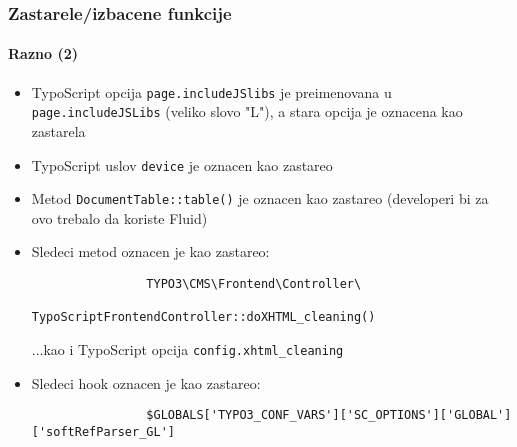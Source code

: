 \begin{frame}[fragile]
	\frametitle{Zastarele/izbacene funkcije}
	\framesubtitle{Razno (2)}

	\begin{itemize}
		\item TypoScript opcija \texttt{page.includeJSlibs} je preimenovana u\newline
			\texttt{page.includeJSLibs} (veliko slovo "L"), a stara opcija je oznacena kao zastarela

		\item TypoScript uslov \texttt{device} je oznacen kao zastareo

		\item Metod \texttt{DocumentTable::table()} je oznacen kao zastareo\newline
			\small(developeri bi za ovo trebalo da koriste Fluid)\normalsize

		\item Sledeci metod oznacen je kao zastareo:
			\begin{lstlisting}
				TYPO3\CMS\Frontend\Controller\
				    TypoScriptFrontendController::doXHTML_cleaning()
			\end{lstlisting}
			...kao i TypoScript opcija
			\small
				\texttt{config.xhtml\_cleaning}
			\normalsize

		\item Sledeci hook oznacen je kao zastareo:
			\begin{lstlisting}
				$GLOBALS['TYPO3_CONF_VARS']['SC_OPTIONS']['GLOBAL']['softRefParser_GL']
			\end{lstlisting}
 
	\end{itemize}

\end{frame}


